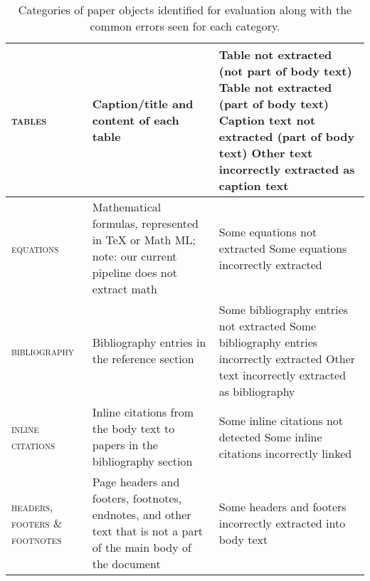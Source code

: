 \begin{table}[t!]
\begin{tabularx}{\linewidth}{L{20mm}L{65mm}X}
        \midrule
        \textsc{tables} & Caption/title and content of each table & Table not extracted (not part of body text) \newline Table not extracted (part of body text) \newline Caption text not extracted (part of body text) \newline Other text incorrectly extracted as caption text  \\
        \midrule
        \textsc{equations} & Mathematical formulas, represented in TeX or Math ML; note: our current pipeline does not extract math & Some equations not extracted \newline Some equations incorrectly extracted \\
        \midrule
        \textsc{bibliography} & Bibliography entries in the reference section & Some bibliography entries not extracted \newline Some bibliography entries incorrectly extracted \newline Other text incorrectly extracted as bibliography \\ 
        \midrule
        \textsc{inline citations} & Inline citations from the body text to papers in the bibliography section & Some inline citations not detected \newline Some inline citations incorrectly linked \\
        \midrule
        \textsc{headers, footers \& footnotes} & Page headers and footers, footnotes, endnotes, and other text that is not a part of the main body of the document & Some headers and footers incorrectly extracted into body text \\
        \bottomrule
    \end{tabularx}
    \caption{Categories of paper objects identified for evaluation along with the common errors seen for each category.}
    \label{tab:eval_cats}

\end{table}
